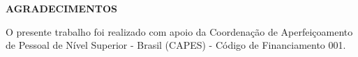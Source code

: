 \begin{center}
    \textbf{AGRADECIMENTOS}
\end{center}

O presente trabalho foi realizado com apoio da Coordenação de Aperfeiçoamento de Pessoal de Nível Superior - Brasil (CAPES) - Código de Financiamento 001.